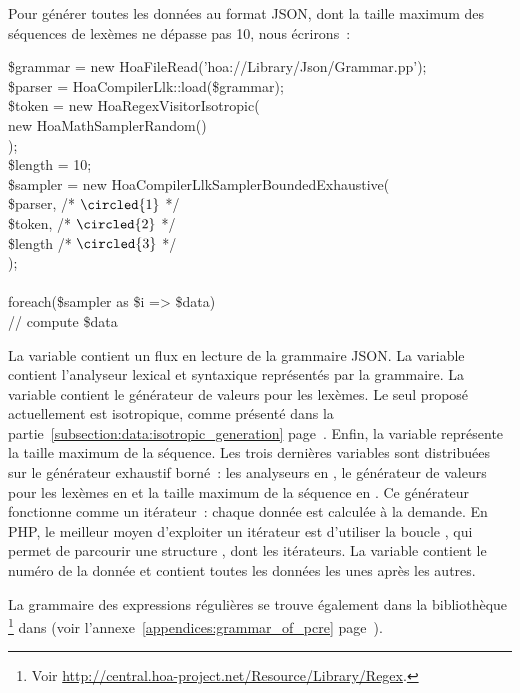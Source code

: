 \begin{example}

Pour générer toutes les données au format JSON, dont la taille maximum des
séquences de lexèmes ne dépasse pas 10, nous écrirons~:
%
\begin{pre}
\$grammar = new Hoa\bslash{}File\bslash{}Read('hoa://Library/Json/Grammar.pp'); \\
\$parser  = Hoa\bslash{}Compiler\bslash{}Llk::load(\$grammar); \\
\$token   = new Hoa\bslash{}Regex\bslash{}Visitor\bslash{}Isotropic( \\
    new Hoa\bslash{}Math\bslash{}Sampler\bslash{}Random() \\
); \\
\$length  = 10; \\
\$sampler = new Hoa\bslash{}Compiler\bslash{}Llk\bslash{}Sampler\bslash{}BoundedExhaustive( \\
    \$parser, /* \(\circled{1}\) */ \\
    \$token,  /* \(\circled{2}\) */ \\
    \$length  /* \(\circled{3}\) */ \\
); \\
 \\
foreach(\$sampler as \$i => \$data) \\
    // compute \$data
\end{pre}
%
La variable  contient un flux en lecture de la grammaire JSON.
La variable  contient l'analyseur lexical et syntaxique
représentés par la grammaire. La variable  contient le générateur
de valeurs pour les lexèmes. Le seul proposé actuellement est isotropique, comme
présenté dans la partie~\ref{subsection:data:isotropic_generation}
page~\pageref{subsection:data:isotropic_generation}. Enfin, la variable
 représente la taille maximum de la séquence. Les trois dernières
variables sont distribuées sur le générateur exhaustif borné~: les analyseurs en
, le générateur de valeurs pour les lexèmes en  et la
taille maximum de la séquence en . Ce générateur fonctionne comme un
itérateur~: chaque donnée est calculée à la demande. En PHP, le meilleur moyen
d'exploiter un itérateur est d'utiliser la boucle , qui permet de
parcourir une structure , dont les itérateurs.  La
variable  contient le numéro de la donnée et  contient
toutes les données les unes après les autres.

\end{example}

La grammaire des expressions régulières se trouve également dans la bibliothèque
\footnote{Voir
\url{http://central.hoa-project.net/Resource/Library/Regex}.} dans
 (voir
l'annexe~\ref{appendices:grammar_of_pcre}
pa\-ge~\pageref{appendices:grammar_of_pcre}).
